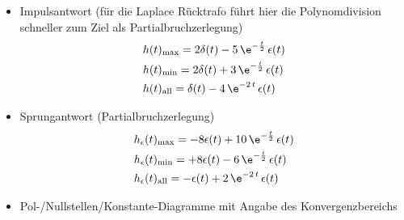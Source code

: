 \begin{itemize}
  \item Impulsantwort (für die Laplace Rücktrafo führt hier die Polynomdivision schneller zum Ziel als Partialbruchzerlegung)
  \begin{align}
  &h(t)_\mathrm{max} = 2\delta(t) - 5\,\e^{-\frac{t}{2}}\,\epsilon(t)\\
  &h(t)_\mathrm{min} = 2\delta(t) + 3\,\e^{-\frac{t}{2}}\,\epsilon(t)\\
  &h(t)_\mathrm{all} = \delta(t) - 4\,\e^{-2\,t}\,\epsilon(t)
  \end{align}
  \item Sprungantwort (Partialbruchzerlegung)
  \begin{align}
  &h_\epsilon(t)_\mathrm{max} = -8 \epsilon(t) + 10 \, \e^{-\frac{t}{2}}\,\epsilon(t)\\
  &h_\epsilon(t)_\mathrm{min} = +8 \epsilon(t) -6 \, \e^{-\frac{t}{2}}\,\epsilon(t)\\
  &h_\epsilon(t)_\mathrm{all} = -\epsilon(t) + 2 \, \e^{-2\,t}\,\epsilon(t)
  \end{align}
  \item Pol-/Nullstellen/Konstante-Diagramme mit Angabe des Konvergenzbereichs


\end{itemize}
